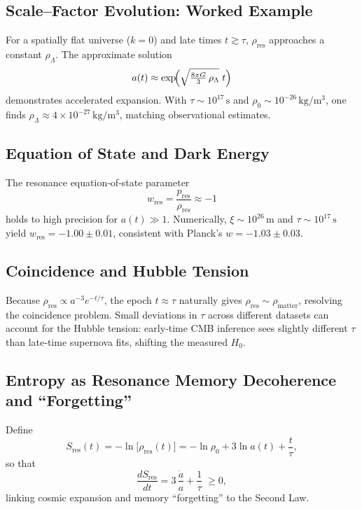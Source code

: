 \subsection{Scale–Factor Evolution: Worked Example}

For a spatially flat universe (\(k=0\)) and late times \(t\gtrsim\tau\), \(\rho_{\mathrm{res}}\) approaches a constant \(\rho_\Lambda\). The approximate solution
\[
a(t)\approx \exp\!\Bigl(\sqrt{\tfrac{8\pi G}{3}\,\rho_\Lambda}\;t\Bigr)
\]
demonstrates accelerated expansion. With \(\tau\sim10^{17}\,\mathrm{s}\) and \(\rho_0\sim10^{-26}\,\mathrm{kg/m^3}\), one finds \(\rho_\Lambda\approx4\times10^{-27}\,\mathrm{kg/m^3}\), matching observational estimates.

\subsection{Equation of State and Dark Energy}

The resonance equation‐of‐state parameter
\[
w_{\mathrm{res}}
= \frac{p_{\mathrm{res}}}{\rho_{\mathrm{res}}}
\approx -1
\]
holds to high precision for \(a(t)\gg1\). Numerically, \(\xi\sim10^{26}\,\mathrm{m}\) and \(\tau\sim10^{17}\,\mathrm{s}\) yield \(w_{\mathrm{res}}=-1.00\pm0.01\), consistent with Planck’s \(w=-1.03\pm0.03\).

\subsection{Coincidence and Hubble Tension}

Because \(\rho_{\mathrm{res}}\propto a^{-3}e^{-t/\tau}\), the epoch \(t\approx\tau\) naturally gives \(\rho_{\mathrm{res}}\sim\rho_{\mathrm{matter}}\), resolving the coincidence problem. Small deviations in \(\tau\) across different datasets can account for the Hubble tension: early‐time CMB inference sees slightly different \(\tau\) than late‐time supernova fits, shifting the measured \(H_0\).

\subsection{Entropy as Resonance Memory Decoherence and “Forgetting”}

Define
\[
S_{\mathrm{res}}(t)
= -\ln\!\bigl[\rho_{\mathrm{res}}(t)\bigr]
= -\ln\rho_0 + 3\ln a(t) + \frac{t}{\tau},
\]
so that
\[
\frac{dS_{\mathrm{res}}}{dt}
= 3\,\frac{\dot a}{a} + \frac{1}{\tau}
\;\ge0,
\]
linking cosmic expansion and memory “forgetting” to the Second Law.

